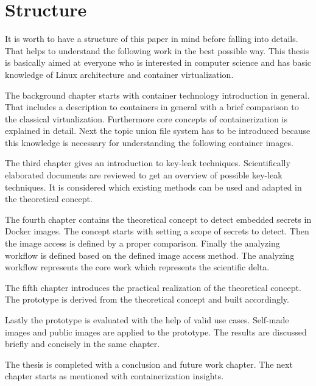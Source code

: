 %
%
\section{Structure}
\label{sec:intro:structure}
It is worth to have a structure of this paper in mind before falling into details. 
That helps to understand the following work in the best possible way. 
This thesis is basically aimed at everyone who is interested in computer science and has basic knowledge of Linux architecture and container virtualization.

The background chapter starts with container technology introduction in general. 
That includes a description to containers in general with a brief comparison to the classical virtualization. 
Furthermore core concepts of containerization is explained in detail.
Next the topic union file system has to be introduced because this knowledge is necessary for understanding the following container images.

The third chapter gives an introduction to key-leak techniques.
Scientifically elaborated documents are reviewed to get an overview of possible key-leak techniques.
It is considered which existing methods can be used and adapted in the theoretical concept.

The fourth chapter contains the theoretical concept to detect embedded secrets in Docker images. 
The concept starts with setting a scope of secrets to detect. Then the image access is defined by a proper comparison.
Finally the analyzing workflow is defined based on the defined image access method.
The analyzing workflow represents the core work which represents the scientific delta.

The fifth chapter introduces the practical realization of the theoretical concept. 
The prototype is derived from the theoretical concept and built accordingly.

Lastly the prototype is evaluated with the help of valid use cases. Self-made images and public images are applied to the prototype. 
The results are discussed briefly and concisely in the same chapter.

The thesis is completed with a conclusion and future work chapter.	
The next chapter starts as mentioned with containerization insights.
